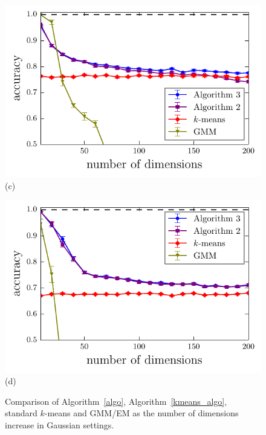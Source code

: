 \documentclass[aps,preprint,nofootinbib,floatfix]{revtex4-1}
\begin{document}
\begin{figure}
\begin{minipage}{0.49\textwidth}
\includegraphics[width=1\textwidth]{gauss_cov_linear.pdf}\\[-1.0em] (c)
\end{minipage}
\begin{minipage}{0.49\textwidth}
\includegraphics[width=1\textwidth]{gauss_cov_square.pdf}\\[-1.0em] (d)
\end{minipage}
\caption{
\label{fig:gauss}
Comparison of Algorithm~\ref{algo}, Algorithm~\ref{kmeans_algo},
standard $k$-means and GMM/EM as the number of dimensions increase
in Gaussian settings.
}
\end{figure}
\end{document}

